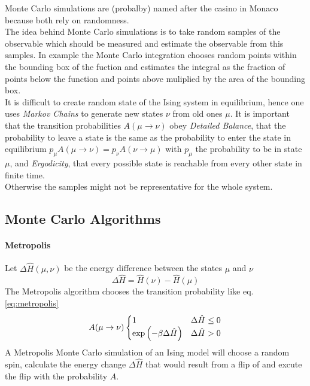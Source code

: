 \label{sec:montecarlo}
Monte Carlo simulations are (probalby) named after the casino in Monaco
\cite{NewmanBarkema1999} because both rely on randomness.\\
The idea behind Monte Carlo simulations is to take random samples of
the observable which should be measured and estimate the observable from
this samples. In example the Monte Carlo integration chooses random
points within the bounding box of the fuction and estimates the integral
as the fraction of points below the function and points above muliplied
by the area of the bounding box.\\
It is difficult to create random state of the Ising system in
equilibrium, hence one uses \emph{Markov Chains} to generate new states
\(\nu\) from old ones \(\mu\).
It is important that the transition probabilities \(A(\mu \to \nu)\)
obey \emph{Detailed Balance}, that the probability to leave a state is
the same as the probability to enter the state in equilibrium
\(p_\mu A(\mu \to \nu) = p_\nu A(\nu \to \mu)\)
with \(p_\mu\) the probability to be in state \(\mu\), and
\emph{Ergodicity}, that every possible state is reachable from every
other state in finite time. \cite{NewmanBarkema1999} \cite{Katzgraber2011}\\
Otherwise the samples might not be representative for the whole system.

\subsection{Monte Carlo Algorithms}
    \paragraph{Metropolis}
        Let \(\Delta \hat H(\mu,\nu)\) be the energy difference between
        the states \(\mu\) and \(\nu\)
        \begin{equation}
            \Delta \hat H = \hat H(\nu) - \hat H(\mu)
        \end{equation}
        The Metropolis algorithm \cite{Metropolis1953} chooses the transition
        probability like eq. \ref{eq:metropolis}
        \begin{equation}
            A(\mu \to \nu)
            \begin{cases}
                1                                   & \Delta \hat H \le 0 \\
                \exp{\ensuremath{\left(-\beta \Delta \hat H\right)}}   & \Delta \hat H > 0
            \end{cases}
            \label{eq:metropolis}
        \end{equation}
        A Metropolis Monte Carlo simulation of an Ising model will choose a
        random spin, calculate the energy change \(\Delta \hat H\) that would
        result from a flip of and excute the flip with the probability \(A\).
        \cite{NewmanBarkema1999} \cite{Katzgraber2011}

